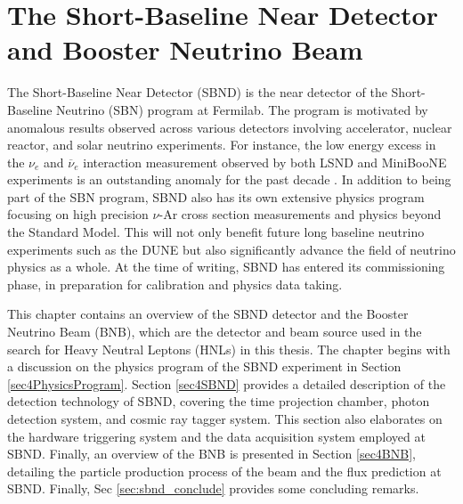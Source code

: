\chapter{The Short-Baseline Near Detector and Booster Neutrino Beam}
\label{ChapterDetector}
\ifpdf
    \graphicspath{{Chapter4/Figs/Raster/}{Chapter4/Figs/PDF/}{Chapter4/Figs/}}
\else
    \graphicspath{{Chapter4/Figs/Vector/}{Chapter4/Figs/}}
\fi


The Short-Baseline Near Detector (SBND) is the near detector of the Short-Baseline Neutrino (SBN) program at Fermilab.
The program is motivated by anomalous results observed across various detectors involving accelerator, nuclear reactor, and solar neutrino experiments.
For instance, the low energy excess in the $\nu_e$ and $\overline{\nu}_e$ interaction measurement observed by both LSND and MiniBooNE experiments is an outstanding anomaly for the past decade \cite{LSND_anomaly, Miniboone_anomaly}.
In addition to being part of the SBN program, SBND also has its own extensive physics program focusing on high precision $\nu$-Ar cross section measurements and physics beyond the Standard Model. 
This will not only benefit future long baseline neutrino experiments such as the DUNE but also significantly advance the field of neutrino physics as a whole.
At the time of writing, SBND has entered its commissioning phase, in preparation for calibration and physics data taking.

This chapter contains an overview of the SBND detector and the Booster Neutrino Beam (BNB), which are the detector and beam source used in the search for Heavy Neutral Leptons (HNLs) in this thesis.
The chapter begins with a discussion on the physics program of the SBND experiment in Section \ref{sec4PhysicsProgram}. 
Section \ref{sec4SBND} provides a detailed description of the detection technology of SBND, covering the time projection chamber, photon detection system, and cosmic ray tagger system. 
This section also elaborates on the hardware triggering system and the data acquisition system employed at SBND.
Finally, an overview of the BNB is presented in Section \ref{sec4BNB}, detailing the particle production process of the beam and the flux prediction at SBND.
Finally, Sec \ref{sec:sbnd_conclude} provides some concluding remarks.  


